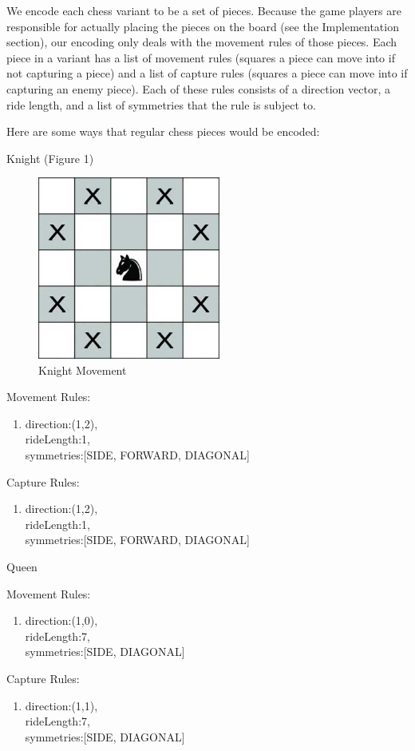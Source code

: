 \documentclass[11pt,letterpaper]{article}
\begin{document}
We encode each chess variant to be a set of pieces. Because the game players are responsible for actually placing the pieces on the board (see the Implementation section), our encoding only deals with the movement rules of those pieces. Each piece in a variant has a list of movement rules (squares a piece can move into if not capturing a piece) and a list of capture rules (squares a piece can move into if capturing an enemy piece). Each of these rules consists of a direction vector, a ride length, and a list of symmetries that the rule is subject to.

Here are some ways that regular chess pieces would be encoded:\\
\begin{center}
Knight (Figure 1)
\end{center}
\begin{figure}
\centering
\includegraphics[width=6cm]{knight.jpg}
\caption{Knight Movement}
\label{fig:boat1}
\end{figure}
Movement Rules:
\begin{enumerate}
\item direction:(1,2),\\
rideLength:1,\\
symmetries:[SIDE, FORWARD, DIAGONAL]
\end{enumerate}
Capture Rules:
\begin{enumerate}
\item direction:(1,2),\\
rideLength:1,\\
symmetries:[SIDE, FORWARD, DIAGONAL]
\end{enumerate}

\begin{center}
Queen
\end{center}
Movement Rules:
\begin{enumerate}
\item direction:(1,0),\\
rideLength:7,\\
symmetries:[SIDE, DIAGONAL]
\end{enumerate}
Capture Rules:
\begin{enumerate}
\item direction:(1,1),\\
rideLength:7,\\
symmetries:[SIDE, DIAGONAL]
\end{enumerate}
\end{document}
